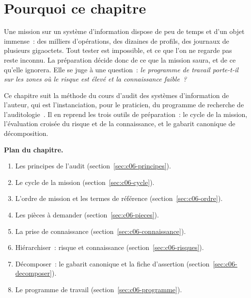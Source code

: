 \bigskip

\section*{Pourquoi ce chapitre}

Une mission sur un système d'information dispose de peu de temps et d'un
objet immense~: des milliers d'opérations, des dizaines de profils, des
journaux de plusieurs gigaoctets. Tout tester est impossible, et ce que
l'on ne regarde pas reste inconnu. La préparation décide donc de ce que la
mission saura, et de ce qu'elle ignorera. Elle se juge à une question~:
\emph{le programme de travail porte-t-il sur les zones où le risque est
élevé et la connaissance faible~?}

Ce chapitre suit la méthode du cours d'audit des systèmes d'information de
l'auteur, qui est l'instanciation, pour le praticien, du programme de
recherche de l'auditologie~\cite{minka2026auditologie}. Il en reprend les
trois outils de préparation~: le cycle de la mission, l'évaluation croisée
du risque et de la connaissance, et le gabarit canonique de décomposition.

\medskip
\textbf{Plan du chapitre.}
\begin{enumerate}
    \item Les principes de l'audit (section~\ref{sec:c06-principes}).
    \item Le cycle de la mission (section~\ref{sec:c06-cycle}).
    \item L'ordre de mission et les termes de référence
          (section~\ref{sec:c06-ordre}).
    \item Les pièces à demander (section~\ref{sec:c06-pieces}).
    \item La prise de connaissance (section~\ref{sec:c06-connaissance}).
    \item Hiérarchiser~: risque et connaissance
          (section~\ref{sec:c06-risques}).
    \item Décomposer~: le gabarit canonique et la fiche d'assertion
          (section~\ref{sec:c06-decomposer}).
    \item Le programme de travail (section~\ref{sec:c06-programme}).
\end{enumerate}

\separateur

